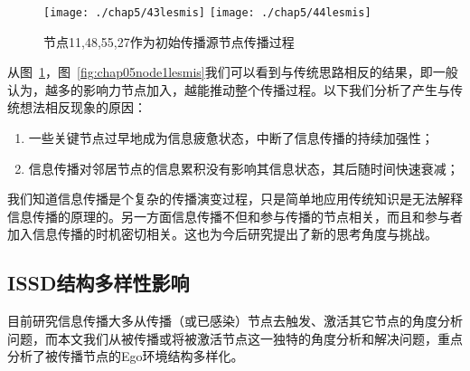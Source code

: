 \addtocounter{figure}{-1}       %
\begin{figure}[H]
	\addtocounter{figure}{1}
	\centering%
	{\texttt{[image: ./chap5/43lesmis]}}
	{\texttt{[image: ./chap5/44lesmis]}}
	\caption{节点11,48,55,27作为初始传播源节点传播过程}
	\label{fig:chap05node4lesmis}
\end{figure}

从图~\ref{fig:chap05node4lesmis}，图~\ref{fig:chap05node1lesmis}我们可以看到与传统思路相反的结果，即一般认为，越多的影响力节点加入，越能推动整个传播过程。以下我们分析了产生与传统想法相反现象的原因：
\begin{enumerate}[(1)]
	\item 一些关键节点过早地成为信息疲惫状态，中断了信息传播的持续加强性；
	\item 信息传播对邻居节点的信息累积没有影响其信息状态，其后随时间快速衰减；
\end{enumerate}

我们知道信息传播是个复杂的传播演变过程，只是简单地应用传统知识是无法解释信息传播的原理的。另一方面信息传播不但和参与传播的节点相关，而且和参与者加入信息传播的时机密切相关。这也为今后研究提出了新的思考角度与挑战。

\subsection{ISSD结构多样性影响}
目前研究信息传播大多从传播（或已感染）节点去触发、激活其它节点的角度分析问题，而本文我们从被传播或将被激活节点这一独特的角度分析和解决问题，重点分析了被传播节点的Ego环境结构多样化。

